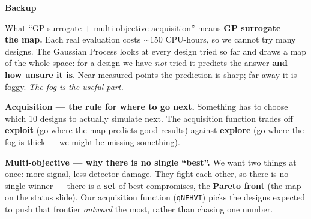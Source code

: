 \documentclass[aspectratio=169,10pt]{beamer}
\begin{document}
\begin{frame}[plain]
\vspace{2.5em}
\begin{center}
{\Large\bfseries\color{fnalblue} Backup}
\end{center}
\end{frame}

\begin{frame}{What ``GP surrogate $+$ multi-objective acquisition'' means}
\small
\textbf{GP surrogate --- the map.}
Each real evaluation costs $\sim$150 CPU-hours, so we cannot try many designs. The Gaussian
Process looks at every design tried so far and draws a map of the whole space: for a design we
have \emph{not} tried it predicts the answer \textbf{and how unsure it is}. Near measured points
the prediction is sharp; far away it is foggy. \emph{The fog is the useful part.}
\vspace{0.7em}

\textbf{Acquisition --- the rule for where to go next.}
Something has to choose which 10 designs to actually simulate next. The acquisition function
trades off \textbf{exploit} (go where the map predicts good results) against \textbf{explore}
(go where the fog is thick --- we might be missing something).
\vspace{0.7em}

\textbf{Multi-objective --- why there is no single ``best''.}
We want two things at once: more signal, less detector damage. They fight each other, so there
is no single winner --- there is a \textbf{set} of best compromises, the \textbf{Pareto front}
(the map on the status slide). Our acquisition function (\texttt{qNEHVI}) picks the designs
expected to push that frontier \emph{outward} the most, rather than chasing one number.
\end{frame}
\end{document}
